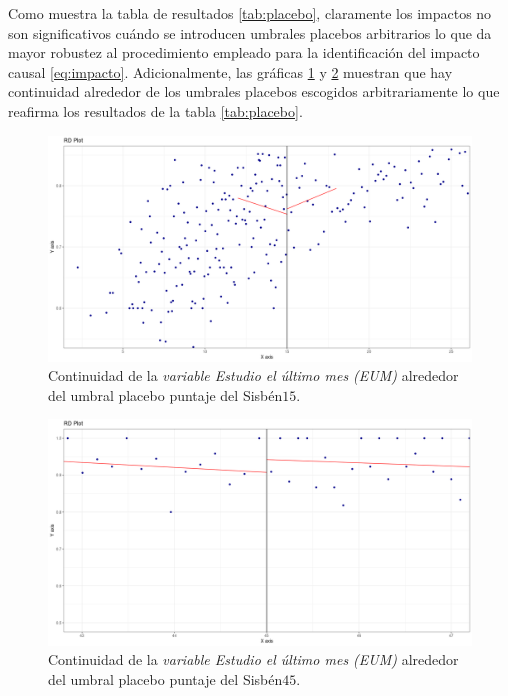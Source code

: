 \documentclass[AER]{AEA}
\begin{document}
Como muestra la tabla de resultados \ref{tab:placebo}, claramente los impactos no son significativos cuándo se introducen umbrales placebos arbitrarios lo que da mayor robustez al procedimiento empleado para la identificación del impacto causal \ref{eq:impacto}. Adicionalmente, las gráficas \ref{fig:placebo1} y \ref{fig:placebo2} muestran que hay continuidad alrededor de los umbrales placebos escogidos arbitrariamente lo que reafirma los resultados de la tabla \ref{tab:placebo}.

\begin{figure}[h!]
    \centering
    \includegraphics[scale = 0.35]{imagenes/estimax_principal/placebo1_main.png}
    \caption{Continuidad de la \textit{variable Estudio el último mes (EUM)} alrededor del umbral placebo puntaje del Sisbén$15$.}
    \label{fig:placebo1}
\end{figure}

\begin{figure}[h!]
    \centering
    \includegraphics[scale = 0.35]{imagenes/estimax_principal/placebo2_main.png}
    \caption{Continuidad de la \textit{variable Estudio el último mes (EUM)} alrededor del umbral placebo puntaje del Sisbén$45$.}
    \label{fig:placebo2}
\end{figure}
\end{document}
